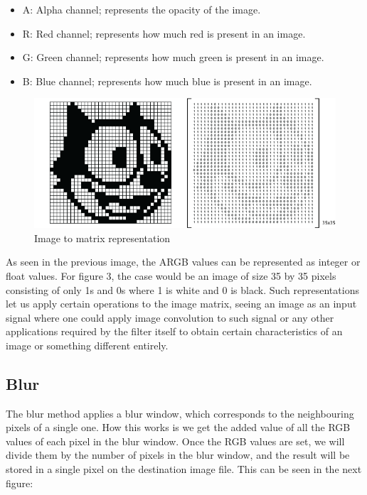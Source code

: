 \documentclass[a4paper,12pt]{article}
\begin{document}
	\begin{itemize}
		\item A: Alpha channel; represents the opacity of the image.
		\item R: Red channel; represents how much red is present in an image.
		\item G: Green channel; represents how much green is present in an image.
		\item B: Blue channel; represents how much blue is present in an image.
	\end{itemize}
	
	
	\begin{figure}[h]
		\begin{center}
			\includegraphics[width=15cm]{sample-matrix.png}
		\end{center}
		\caption{Image to matrix representation}
	\end{figure}
	
	
	
	As seen in the previous image, the ARGB values can be represented as integer or float values. For figure 3, the case would be an image of size 35 by 35 pixels consisting of only 1s and 0s where 1 is white and 0 is black. Such representations let us apply certain operations to the image matrix, seeing an image as an input signal where one could apply image convolution to such signal or any other applications required by the filter itself to obtain certain characteristics of an image or something different entirely. 
	
	\subsection{Blur}
	
	The blur method applies a blur window, which corresponds to the neighbouring pixels of a single one. How this works is we get the added value of all the RGB values of each pixel in the blur window. Once the RGB values are set, we will divide them by the number of pixels in the blur window, and the result will be stored in a single pixel on the destination image file. This can be seen in the next figure:
	
\end{document}
